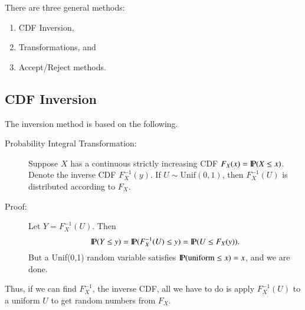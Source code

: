 \documentclass[captions=tableheading]{scrbook}
\begin{document}
There are three general methods: 

\begin{enumerate}
\item CDF Inversion,
\item Transformations, and
\item Accept/Reject methods.
\end{enumerate}
\subsection{CDF Inversion}
\label{sec-2_3_1}


The inversion method is based on the following.


\begin{description}
\item[Probability Integral Transformation:] Suppose \(X\) has a continuous strictly increasing CDF $F_{X}(x)=\P(X \leq x)$. Denote the inverse CDF $F_{X}^{-1}(y)$.  If $U\sim\mathrm{Unif}(0,1)$, then $F_{X}^{-1}(U)$ is distributed according to $F_{X}$.
\item[Proof:] Let \(Y = F_{X}^{-1}(U)\). Then 
  \[
  \P(Y \leq y)=\P(F_{X}^{-1}(U)\leq y)=\P(U\leq F_{X}(y)).
  \]
  But a Unif(0,1) random variable satisfies $\P(\mbox{uniform}\leq x) = x$, and we are done.
\end{description}

Thus, if we can find $F_{X}^{-1}$, the inverse CDF, all we have to do is apply $F_{X}^{-1}(U)$ to a uniform $U$ to get random numbers from $F_{X}$.
\end{document}
